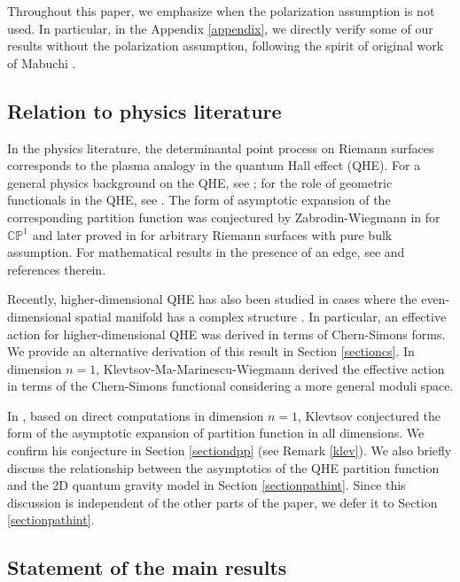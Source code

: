 \documentclass[12pt,reqno,a4paper]{amsart}
\numberwithin{equation}{section}
\theoremstyle{remark}
\theoremstyle{dotless}
\begin{document}
Throughout this paper, we emphasize when the polarization assumption is not used. In particular, in the Appendix \ref{appendix}, we directly verify some of our results without the polarization assumption, following the spirit of original work of Mabuchi \cite{mabuchi1986k}.


\subsection{Relation to physics literature}

In the physics literature, the determinantal point process on Riemann surfaces corresponds to the plasma analogy in the quantum Hall effect (QHE). For a general physics background on the QHE, see \cite{tong2016lectures}; for the role of geometric functionals in the QHE, see \cite{can2015geometry,klevtsov2016geometry}. The form of asymptotic expansion of the corresponding partition function was conjectured by Zabrodin-Wiegmann in \cite{zabrodin2006large} for $\mathbb{CP}^1$ and later proved in \cite{klevtsov2014random,klevtsov2017quantum,shen2025geometric} for arbitrary Riemann surfaces with pure bulk assumption. For mathematical results in the presence of an edge, see \cite{serfaty2024lectures,byun2023partition,byun2025free} and references therein.

Recently, higher-dimensional QHE has also been studied in cases where the even-dimensional spatial manifold has a complex structure \cite{karabali2016geometry,karabali2023transport,agarwal2025fractional}. In particular, an effective action for higher-dimensional QHE was derived in terms of Chern-Simons forms. We provide an alternative derivation of this result in Section \ref{sectioncs}. In dimension $n=1$, Klevtsov-Ma-Marinescu-Wiegmann \cite{klevtsov2017quantum} derived the effective action in terms of the Chern-Simons functional considering a more general moduli space.

In \cite{klevtsov2014random}, based on direct computations in dimension $n=1$, Klevtsov conjectured the form of the asymptotic expansion of partition function in all dimensions. We confirm his conjecture in Section \ref{sectiondpp} (see Remark \ref{klev}). We also briefly discuss the relationship between the asymptotics of the QHE partition function and the 2D quantum gravity model in Section \ref{sectionpathint}. Since this discussion is independent of the other parts of the paper, we defer it to Section \ref{sectionpathint}.


\subsection{Statement of the main results}
\end{document}
